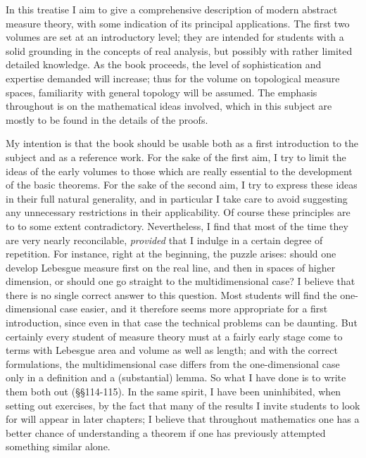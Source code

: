 \bigskip

 In this treatise I aim to give a
comprehensive description of modern abstract measure theory, with some
indication of its principal applications.   The first two volumes are
set at an introductory level;  they are intended for students with a
solid grounding in the concepts of real analysis, but possibly with
rather limited detailed knowledge.    As the book proceeds, the
level of sophistication and expertise demanded will increase;  thus for
the volume on topological measure spaces, familiarity with general
topology will be assumed.
The emphasis throughout is on the mathematical ideas involved, which in
this subject are mostly to be found in the details of the proofs.

My intention is that the book should be usable both as a first
introduction to the subject and as a reference work.   For the sake of
the first aim, I try to limit the ideas of the early volumes to those
which are really essential to the development of the basic theorems.
For the sake of the second aim, I try to express these ideas in their
full natural generality, and in particular I take care to avoid
suggesting any unnecessary restrictions in their applicability.   Of
course these principles are to to some extent contradictory.
Nevertheless, I find that most of the time they are very nearly
reconcilable, {\it provided} that I indulge in a certain degree of
repetition.   For instance, right at the beginning, the puzzle arises:
should one develop Lebesgue measure first on the real line, and then in
spaces of higher dimension, or should one go straight to the
multidimensional case?   I believe that there is no single correct
answer to this question.   Most students will find the one-dimensional
case easier, and it therefore seems more appropriate for a first
introduction, since even in that case the technical problems can be
daunting.   But certainly every student of measure theory must at a
fairly early stage
come to terms with Lebesgue area and volume as well as length;
and with the correct formulations, the multidimensional case differs
from the one-dimensional case only in a definition and a (substantial)
lemma.   So what I have done is to write them both out (\S\S114-115).
In the same spirit, I have been uninhibited, when setting out exercises,
by the fact that many of the results I invite students to look for will
appear in later chapters;  I believe that throughout mathematics one has
a better chance of understanding a theorem if one has previously
attempted something similar alone.

